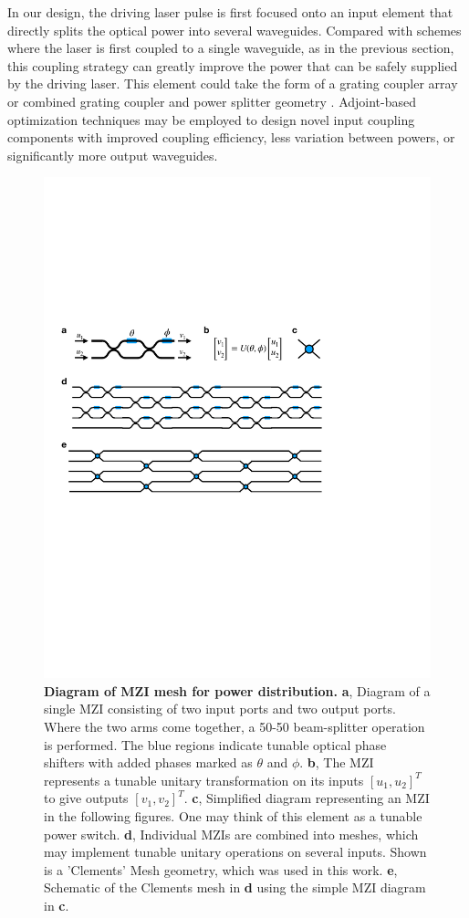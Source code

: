 In our design, the driving laser pulse is first focused onto an input element that directly splits the optical power into several waveguides.  Compared with schemes where the laser is first coupled to a single waveguide, as in the previous section, this coupling strategy can greatly improve the power that can be safely supplied by the driving laser. This element could take the form of a grating coupler array or combined grating coupler and power splitter geometry \cite{spuesens2016grating}.  Adjoint-based optimization techniques \cite{sapra2019inverse} may be employed to design novel input coupling components with improved coupling efficiency, less variation between powers, or significantly more output waveguides.

\begin{figure}
\includegraphics[width=1\columnwidth]{figures/MZI_MZI}
\caption{\label{fig:mesh} \textbf{Diagram of MZI mesh for power distribution.} \textbf{a}, Diagram of a single MZI consisting of two input ports and two output ports.  Where the two arms come together, a 50-50 beam-splitter operation is performed.  The blue regions indicate tunable optical phase shifters with added phases marked as $\theta$ and $\phi$.  \textbf{b}, The MZI represents a tunable unitary transformation on its inputs $[u_1, u_2]^T$ to give outputs $[v_1, v_2]^T$.  \textbf{c}, Simplified diagram representing an MZI in the following figures.  One may think of this element as a tunable power switch. \textbf{d}, Individual MZIs are combined into meshes, which may implement tunable unitary operations on several inputs.  Shown is a 'Clements' Mesh geometry, which was used in this work. \textbf{e}, Schematic of the Clements mesh in \textbf{d} using the simple MZI diagram in \textbf{c}.}

\end{figure}
